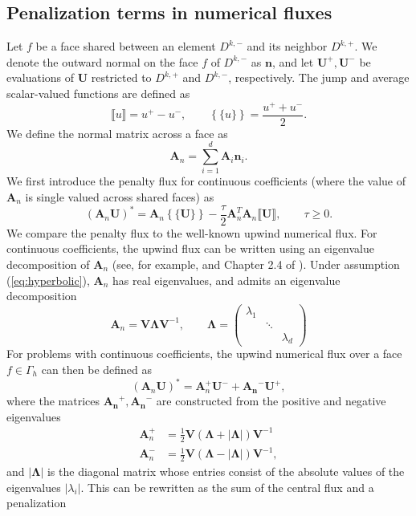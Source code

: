 \documentclass[preprint,10pt]{elsarticle}
\newcommand{\LRp}[1]{\left( #1 \right)}
\newcommand{\LRb}[1]{\left| #1 \right|}
\newcommand{\LRc}[1]{\left\{ #1 \right\}}
\newcommand{\jump}[1] {\ensuremath{\llbracket#1\rrbracket}}
\newcommand{\avg}[1] {\ensuremath{\LRc{\!\{#1\}\!}}}
\newcommand{\Gh}{\Gamma_h}
\newcommand{\note}[1]{#1}
\begin{document}
\subsection{Penalization terms in numerical fluxes}
\label{sec:scaletau}

Let $f$ be a face \note{shared between} an element $D^{k,-}$ and its neighbor $D^{k,+}$.  We denote the outward normal on the face $f$ of $D^{k,-}$ as $\bm{n}$, and let $\bm{U}^+, \bm{U}^-$ be evaluations of $\bm{U}$ restricted to $D^{k,+}$ and $D^{k,-}$, respectively.  The jump and average scalar-valued functions are defined as 
\[
\note{\jump{u} = u^+ - u^-, \qquad \avg{u} = \frac{{u}^+ + u^-}{2}.}
\]
We define the normal matrix across a face as
\[
{\bm{A}}_n = \sum_{i=1}^d {\bm{A}_i\bm{n}_i}.
\]
\note{We first introduce the penalty flux for continuous coefficients (where the value of $\bm{A}_n$ is single valued across shared faces) as}
\[
(\bm{A}_n\bm{U})^* = \bm{A}_n\avg{\bm{U}} - \frac{\tau}{2} \bm{A}_n^T \bm{A}_n\jump{\bm{U}}, \qquad \tau \geq 0.
\]
We compare the penalty flux to the well-known upwind numerical flux.  For \note{continuous coefficients, the upwind flux can be written using an eigenvalue decomposition of $\bm{A}_n$ (see, for example, \cite{ye2016discontinuous} and Chapter 2.4 of \cite{hesthaven2007nodal})}.  
Under assumption (\ref{eq:hyperbolic}), ${\bm{A}}_n$ has real eigenvalues, and admits an eigenvalue decomposition
\[
\bm{A}_n = \bm{V}{\bm{\Lambda}}\note{\bm{V}^{-1}}, \qquad \bm{\Lambda} = 
\left(\begin{array}{ccc}
\lambda_1 & & \\
& \ddots & \\
& & \lambda_d
\end{array}\right)
\]
For problems with continuous coefficients, the upwind numerical flux over a face $f \in \Gh$ can then be defined  as
\[
(\bm{A}_n\bm{U})^* = \bm{A}_n^+\bm{U}^- + \bm{A_n}^- \bm{U}^+,
\]
where the matrices $\bm{A_n}^+,\bm{A_n}^-$ are constructed from the positive and negative eigenvalues 
\begin{align*}
\bm{A}_n^+ &= \frac{1}{2}\bm{V} \LRp{\bm{\Lambda} + \LRb{\bm{\Lambda}}} \note{\bm{V}^{-1}}\\
\bm{A}_n^- &= \frac{1}{2}\bm{V} \LRp{\bm{\Lambda} - \LRb{\bm{\Lambda}}} \note{\bm{V}^{-1}},
\end{align*}
and $\LRb{\bm{\Lambda}}$ is the diagonal matrix whose entries consist of the absolute values of the eigenvalues $\LRb{\lambda_i}$.  This can be rewritten as the sum of the central flux and a penalization
\end{document}
